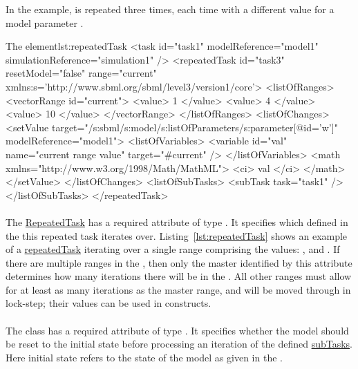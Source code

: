 In the example,  is repeated three times, each time with a different value for a model parameter .
\begin{myXmlLst}{The  element}{lst:repeatedTask}
<task id="task1" modelReference="model1" simulationReference="simulation1" />
<repeatedTask id="task3" resetModel="false" range="current"
    xmlns:s='http://www.sbml.org/sbml/level3/version1/core'>
  <listOfRanges>
    <vectorRange id="current"> 
        <value> 1 </value> 
        <value> 4 </value> 
        <value> 10 </value> 
    </vectorRange> 
  </listOfRanges>
  <listOfChanges>
     <setValue target="/s:sbml/s:model/s:listOfParameters/s:parameter[@id='w']" modelReference="model1">
       <listOfVariables> 
         <variable id="val" name="current range value" target="#current" /> 
       </listOfVariables> 
       <math xmlns="http://www.w3.org/1998/Math/MathML"> 
         <ci> val </ci> 
       </math> 
     </setValue> 
  </listOfChanges>
  <listOfSubTasks>
    <subTask task="task1" />
  </listOfSubTasks>
</repeatedTask>
\end{myXmlLst}
 
\paragraph{}
\label{sec:rangeAttribute}
The \hyperref[class:repeatedTask]{RepeatedTask} has a required attribute  of type \hyperref[type:sidref]{}. It specifies which  defined in the \hyperref[sec:listOfRanges]{} this repeated task iterates over.
Listing~\ref{lst:repeatedTask} shows an example of a \hyperref[class:repeatedTask]{repeatedTask} iterating over a single range comprising the values: ,  and .
If there are multiple ranges in the , then only the master  identified by this attribute determines how many iterations there will be in the . All other ranges must allow for at least as many iterations as the master range, and will be moved through in lock-step; their values can be used in \hyperref[class:setValue]{} constructs.

\paragraph{}
\label{sec:resetModel}
The  class has a required attribute  of type . It specifies whether the model should be reset to the initial state before processing an iteration of the defined \hyperref[class:subTask]{subTasks}. Here initial state refers to the state of the model as given in the .

